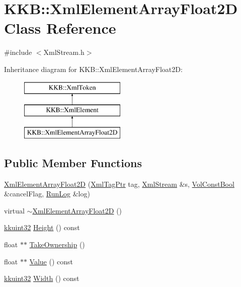 \hypertarget{class_k_k_b_1_1_xml_element_array_float2_d}{}\section{K\+KB\+:\+:Xml\+Element\+Array\+Float2D Class Reference}
\label{class_k_k_b_1_1_xml_element_array_float2_d}


{\ttfamily \#include $<$Xml\+Stream.\+h$>$}

Inheritance diagram for K\+KB\+:\+:Xml\+Element\+Array\+Float2D\+:\begin{figure}[H]
\begin{center}
\leavevmode
\includegraphics[height=3.000000cm]{class_k_k_b_1_1_xml_element_array_float2_d}
\end{center}
\end{figure}
\subsection*{Public Member Functions}
\begin{DoxyCompactItemize}
\item 
\hyperlink{class_k_k_b_1_1_xml_element_array_float2_d_aa8d28636e1c4b02eaf53bcc551d063bf}{Xml\+Element\+Array\+Float2D} (\hyperlink{namespace_k_k_b_a9253a3ea8a5da18ca82be4ca2b390ef0}{Xml\+Tag\+Ptr} tag, \hyperlink{class_k_k_b_1_1_xml_stream}{Xml\+Stream} \&s, \hyperlink{namespace_k_k_b_a7d390f568e2831fb76b86b56c87bf92f}{Vol\+Const\+Bool} \&cancel\+Flag, \hyperlink{class_k_k_b_1_1_run_log}{Run\+Log} \&log)
\item 
virtual \hyperlink{class_k_k_b_1_1_xml_element_array_float2_d_a0d59fbcc7bf57b41052f21aef8047b55}{$\sim$\+Xml\+Element\+Array\+Float2D} ()
\item 
\hyperlink{namespace_k_k_b_af8d832f05c54994a1cce25bd5743e19a}{kkuint32} \hyperlink{class_k_k_b_1_1_xml_element_array_float2_d_a70b0a88c0e9b2eefebfbd3c5a6c86bd0}{Height} () const 
\item 
float $\ast$$\ast$ \hyperlink{class_k_k_b_1_1_xml_element_array_float2_d_a9ddbec915d546b1a3c4d2ca09096f47c}{Take\+Ownership} ()
\item 
float $\ast$$\ast$ \hyperlink{class_k_k_b_1_1_xml_element_array_float2_d_af0b16fd19c24bf2abc31261c26cc5e4c}{Value} () const 
\item 
\hyperlink{namespace_k_k_b_af8d832f05c54994a1cce25bd5743e19a}{kkuint32} \hyperlink{class_k_k_b_1_1_xml_element_array_float2_d_aee02609107b81bf36fbc5d10b53d76a3}{Width} () const 
\end{DoxyCompactItemize}
